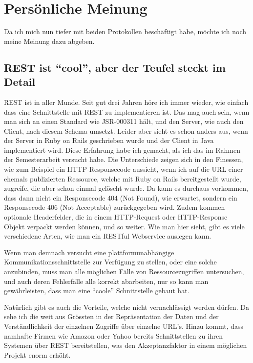 \documentclass[abstracton, listof=totocnumbered,
bibliography=totocnumbered]{scrreprt}
\begin{document}
  \clearpage
 
  \section{Persönliche Meinung}
  
  Da ich mich nun tiefer mit beiden Protokollen beschäftigt habe, möchte ich
  noch meine Meinung dazu abgeben.
  
  \subsection{REST ist ``cool'', aber der Teufel steckt im Detail}
  
  REST ist in aller Munde. Seit gut drei Jahren höre ich immer wieder, wie
  einfach dass eine Schnittstelle mit REST zu implementieren ist. Das mag auch
  sein, wenn man sich an einen Standard wie JSR-000311\cite{JSR311} hält, und
  den Server, wie auch den Client, nach diesem Schema umsetzt. Leider aber sieht
  es schon anders aus, wenn der Server in Ruby on Rails\cite{RoR} geschrieben
  wurde und der Client in Java implementiert wird. Diese Erfahrung habe ich
  gemacht, als ich das im Rahmen der Semesterarbeit versucht habe. Die
  Unterschiede zeigen sich in den Finessen, wie zum Beispiel ein
  HTTP-Responsecode aussieht, wenn ich auf die \ac{URL} einer ehemals
  publizierten Ressource, welche mit Ruby on Rails bereitgestellt wurde,
  zugreife, die aber schon einmal gelöscht wurde. Da kann es durchaus
  vorkommen, dass dann nicht ein Responsecode 404 (Not Found), wie erwartet, 
  sondern ein Responsecode 406 (Not Acceptable) zurückgegeben wird. Zudem kommen
  optionale Headerfelder, die in einem HTTP-Request oder HTTP-Response Objekt verpackt
  werden können, und so weiter. Wie man hier sieht, gibt es viele verschiedene
  Arten, wie man ein RESTful Webservice auslegen kann.
  
  Wenn man demnach versucht eine plattformunabhängige
  Kommunikationsschnittstelle zur Verfügung zu stellen, oder eine solche
  anzubinden, muss man alle möglichen Fälle von Ressourcezugriffen untersuchen,
  und auch deren Fehlerfälle alle korrekt abarbeiten, nur so kann man
  gewährleisten, dass man eine ``coole'' Schnittstelle gebaut hat.
  
  Natürlich gibt es auch die Vorteile, welche nicht vernachlässigt werden
  dürfen. Da sehe ich die weit aus Grössten in der Repräsentation der Daten und
  der Verständlichkeit der einzelnen Zugriffe über einzelne \ac{URL}'s. Hinzu
  kommt, dass namhafte Firmen wie Amazon oder Yahoo bereits Schnittstellen zu
  ihren Systemen über REST bereitstellen, was den Akzeptanzfaktor in einem
  möglichen Projekt enorm erhöht.
\end{document}

